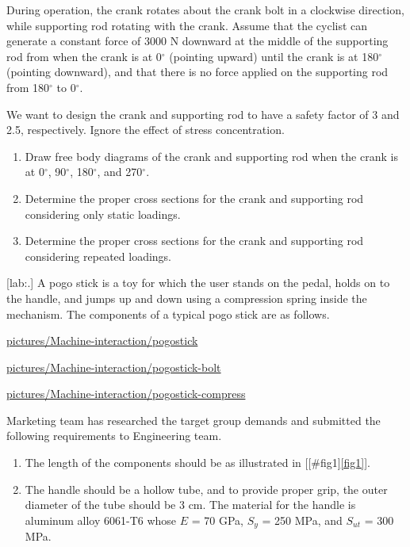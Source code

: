 \documentclass[a4paper,openany,12pt]{book}
\begin{document}
{{During operation, the crank rotates about the crank bolt in a clockwise
direction, while supporting rod rotating with the crank. Assume that the
cyclist can generate a constant force of 3000 N downward at the middle
of the supporting rod from when the crank is at 0\(^{\circ}\) (pointing
upward) until the crank is at 180\(^{\circ}\) (pointing downward), and
that there is no force applied on the supporting rod from 180\(^{\circ}\)
to 0\(^{\circ}\).

We want to design the crank and supporting rod to have a safety factor
of 3 and 2.5, respectively. Ignore the effect of stress concentration.

\begin{enumerate}
\item Draw free body diagrams of the crank and supporting rod when the
crank is at 0\(^{\circ}\), 90\(^{\circ}\), 180\(^{\circ}\), and
270\(^{\circ}\).

\item Determine the proper cross sections for the crank and supporting rod
considering only static loadings.

\item Determine the proper cross sections for the crank and supporting rod
considering repeated loadings.
\end{enumerate}

[lab:.] A pogo stick is a toy for
which the user stands on the pedal, holds on to the handle, and jumps up
and down using a compression spring inside the mechanism. The components
of a typical pogo stick are as follows.


\url{pictures/Machine-interaction/pogostick}

\hfill

\url{pictures/Machine-interaction/pogostick-bolt}

\url{pictures/Machine-interaction/pogostick-compress}

Marketing team has researched the target group demands and submitted the
following requirements to Engineering team.

\begin{enumerate}
\item The length of the components should be as illustrated in
[[\#fig1]\ref{fig1}].

\item The handle should be a hollow tube, and to provide proper grip, the
outer diameter of the tube should be 3 cm. The material for the
handle is aluminum alloy 6061-T6 whose \(E\) = 70 GPa, \(S_y\) = 250 MPa,
and \(S_{ut}\) = 300 MPa.


\end{enumerate}}}
\end{document}
